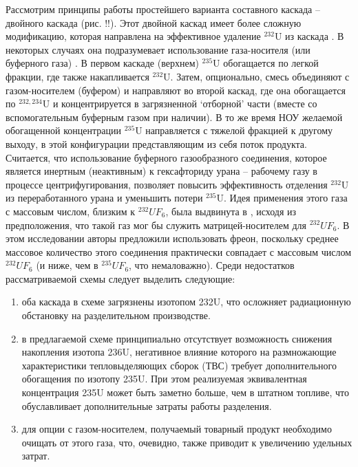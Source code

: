 Рассмотрим принципы работы простейшего варианта составного каскада -- двойного каскада (рис. !!). Этот двойной каскад имеет более сложную модификацию, которая направлена на эффективное удаление $^{232}$U из каскада \cite{SosninYuChelcov, TehnicheskieResheniyaPo, SposobIzotopnogoVosstanovleniya}. В некоторых случаях она подразумевает использование газа-носителя (или буферного газа) \cite{prusakovCorrectingIsotopicComposition2008, SposobIzotopnogoVosstanovleniyab}. В первом каскаде (верхнем) $^{235}$U обогащается по легкой фракции, где также накапливается $^{232}$U. Затем, опционально, смесь объединяют с газом-носителем (буфером) и направляют во второй каскад, где она обогащается по $^{232,234}$U и концентрируется в загрязненной `отборной' части (вместе со вспомогательным буферным газом при наличии). В то же время НОУ желаемой обогащенной концентрации $^{235}$U направляется с тяжелой фракцией к другому выходу, в этой конфигурации представляющим из себя поток продукта.
Считается, что использование буферного газообразного соединения, которое является инертным (неактивным) к гексафториду урана -- рабочему газу в процессе центрифугирования, позволяет повысить эффективность отделения $^{232}$U из переработанного урана и уменьшить потери $^{235}$U. Идея применения этого газа с массовым числом, близким к $^{232}UF_6$, была выдвинута в \cite{SosninYuChelcov}, исходя из предположения, что такой газ мог бы служить матрицей-носителем для $^{232}UF_6$. В этом исследовании авторы предложили использовать фреон, поскольку среднее массовое количество этого соединения практически совпадает с массовым числом $^{232}UF_6$ (и ниже, чем в $^{235}UF_6$, что немаловажно).
Среди недостатков рассматриваемой схемы следует выделить следующие:
\begin{enumerate}
  \item оба каскада в схеме загрязнены изотопом 232U, что осложняет радиационную обстановку на разделительном производстве.
  \item в предлагаемой схеме принципиально отсутствует возможность снижения накопления изотопа 236U, негативное влияние которого на размножающие характеристики тепловыделяющих сборок (ТВС) требует дополнительного обогащения по изотопу 235U. При этом реализуемая эквивалентная концентрация 235U может быть заметно больше, чем в штатном топливе, что обуславливает дополнительные затраты работы разделения.
  \item для опции с газом-носителем, получаемый товарный продукт необходимо очищать от этого газа, что, очевидно, также приводит к увеличению удельных затрат.
\end{enumerate}

